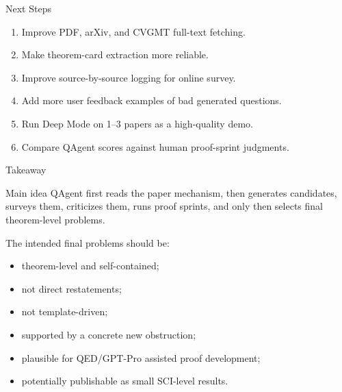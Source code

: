 \documentclass[aspectratio=169,11pt]{beamer}
\begin{document}
\begin{frame}{Next Steps}
  \begin{enumerate}
    \item Improve PDF, arXiv, and CVGMT full-text fetching.
    \item Make theorem-card extraction more reliable.
    \item Improve source-by-source logging for online survey.
    \item Add more user feedback examples of bad generated questions.
    \item Run Deep Mode on 1--3 papers as a high-quality demo.
    \item Compare QAgent scores against human proof-sprint judgments.
  \end{enumerate}
\end{frame}

\begin{frame}{Takeaway}
  \begin{block}{Main idea}
    QAgent first reads the paper mechanism, then generates candidates, surveys them, criticizes them, runs proof sprints, and only then selects final theorem-level problems.
  \end{block}

  \vspace{0.5em}
  The intended final problems should be:
  \begin{itemize}
    \item theorem-level and self-contained;
    \item not direct restatements;
    \item not template-driven;
    \item supported by a concrete new obstruction;
    \item plausible for QED/GPT-Pro assisted proof development;
    \item potentially publishable as small SCI-level results.
  \end{itemize}
\end{frame}
\end{document}
